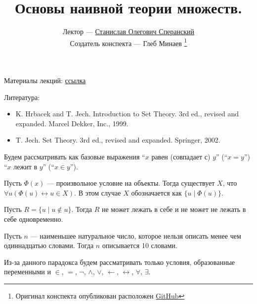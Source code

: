\documentclass[12pt,a4paper]{article}
\title{Основы наивной теории множеств.}
\author{Лектор --- \href{https://users.math-cs.spbu.ru/~speranski}{Станислав Олегович Сперанский} \\
        Создатель конспекта --- Глеб Минаев
        \footnote{Оригинал конспекта опубликован расположен \href{https://github.com/lounres/SPbU-MCS-2020-M-lecture-notes}{GitHub}}}
\date{}
\begin{document}
    \maketitle

    Материалы лекций: \href{https://users.math-cs.spbu.ru/~speranski/courses/sets-2020-autumn/materials.html}{ссылка}
    
    Литература:
    \begin{itemize}
        \item K. Hrbacek and T. Jech. Introduction to Set Theory. 3rd ed., revised and expanded. Marcel Dekker, Inc., 1999.
        \item T. Jech. Set Theory. 3rd ed., revised and expanded. Springer, 2002.
    \end{itemize}

    Будем рассматривать как базовые выражения ``$x$ равен (совпадает с) $y$'' (``$x=y$'') ``$x$ лежит в $y$'' (``$x\in y$'').

    \begin{definition}
        Пусть $\Phi(x)$ --- произвольное условие на объекты. Тогда существует $X$, что $\forall u (\Phi(u) \leftrightarrow u \in X)$. В этом случае $X$ обозначается как $\{u \mid \Phi(u)\}$.
    \end{definition}

    \begin{statement}
        Пусть $R = \{u \mid u \notin u\}$. Тогда $R$ не может лежать в себе и не может не лежать в себе одновременно.
    \end{statement}

    \begin{statement}
        Пусть $n$ --- наименьшее натуральное число, которое нельзя описать менее чем одиннадцатью словами. Тогда $n$ описывается 10 словами.
    \end{statement}

    Из-за данного парадокса будем рассматривать только условия, образованные переменными и $\in$, $=$, $\neg$, $\wedge$, $\vee$, $\leftarrow$, $\leftrightarrow$, $\forall$, $\exists$.
\end{document}
